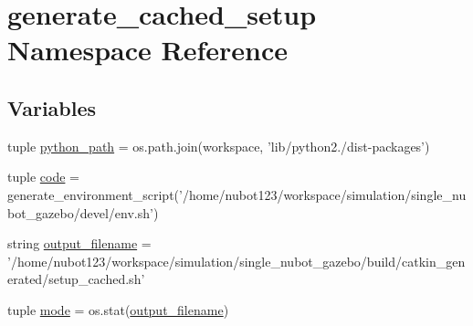 \hypertarget{namespacegenerate__cached__setup}{\section{generate\-\_\-cached\-\_\-setup Namespace Reference}
\label{namespacegenerate__cached__setup}
}
\subsection*{Variables}
\begin{DoxyCompactItemize}
\item 
tuple \hyperlink{namespacegenerate__cached__setup_a770288702e38f06cf1b86a33bc07723e}{python\-\_\-path} = os.\-path.\-join(workspace, 'lib/python2./dist-\/packages')
\item 
tuple \hyperlink{namespacegenerate__cached__setup_a4ed71aac3acd6cda6640f912559b5408}{code} = generate\-\_\-environment\-\_\-script('/home/nubot123/workspace/simulation/single\-\_\-nubot\-\_\-gazebo/devel/env.\-sh')
\item 
string \hyperlink{namespacegenerate__cached__setup_a0265aee5075ee1eb701ff69c98ad6793}{output\-\_\-filename} = '/home/nubot123/workspace/simulation/single\-\_\-nubot\-\_\-gazebo/build/catkin\-\_\-generated/setup\-\_\-cached.\-sh'
\item 
tuple \hyperlink{namespacegenerate__cached__setup_afd1a431f16a2a78ef0438a658e4ac3cf}{mode} = os.\-stat(\hyperlink{namespacegenerate__cached__setup_a0265aee5075ee1eb701ff69c98ad6793}{output\-\_\-filename})
\end{DoxyCompactItemize}


